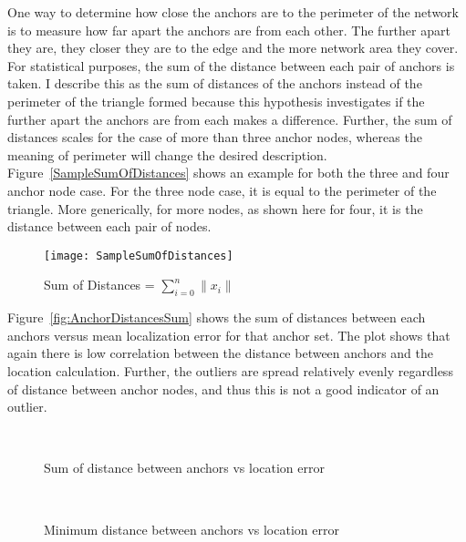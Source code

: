 One way to determine how close the anchors are to the perimeter of the network is to measure how far apart the anchors are from each other.  The further apart they are, they closer they are to the edge and the more network area they cover.  For statistical purposes, the sum of the distance between each pair of anchors is taken.  I describe this as the sum of distances of the anchors instead of the perimeter of the triangle formed because this hypothesis investigates if the further apart the anchors are from each makes a difference. Further, the sum of distances scales for the case of more than three anchor nodes, whereas the meaning of perimeter will change the desired description.  Figure~\ref{SampleSumOfDistances} shows an example for both the three and four anchor node case.  For the three node case, it is equal to the perimeter of the triangle.  More generically, for more nodes, as shown here for four, it is the distance between each pair of nodes.

\begin{figure}
  \centering
    \texttt{[image: SampleSumOfDistances]}
    \caption{Sum of Distances = $\sum_{i=0}^{n} \|x_{i}\| $}
	\label{fig:SampleSumOfDistances}
\end{figure}

Figure~\ref{fig:AnchorDistancesSum} shows the sum of distances between each anchors versus mean localization error for that anchor set. The plot shows that again there is low correlation between the distance between anchors and the location calculation.  Further, the outliers are spread relatively evenly regardless of distance between anchor nodes, and thus this is not a good indicator of an outlier.

\begin{figure}
  \centering
\\
	\caption{Sum of distance between anchors vs location error}
    \label{fig:SumAnchorDistances}		
\end{figure}
\begin{figure}
  \centering
\\
	\caption{Minimum distance between anchors vs location error}
    \label{fig:MinAnchorDistances}
\end{figure}

